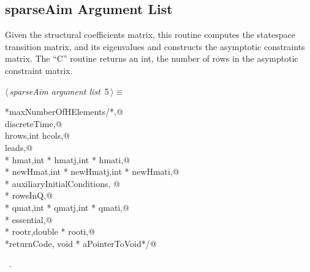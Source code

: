 \documentclass{article}
\begin{document}
\subsection{sparseAim Argument List}
\label{sec:sparseAim}
Given the structural coefficients matrix, this routine computes
the statespace transition matrix,
and its eigenvalues and constructs the asymptotic constraints matrix.
The ``C'' routine returns an int, the number of rows in the asymptotic constraint
matrix.
\begin{flushleft} \small
\begin{minipage}{\linewidth}\label{scrap1}\raggedright\small
{} $\langle\,${\itshape sparseAim argument list}\nobreak\ {\footnotesize {5}}$\,\rangle\equiv$
\vspace{-1ex}
\begin{list}{}{} \item
\mbox{}\verb@int *maxNumberOfHElements/*,@\\
\mbox{}\verb@int discreteTime,@\\
\mbox{}\verb@int hrows,int hcols,@\\
\mbox{}\verb@int leads,@\\
\mbox{}\verb@double * hmat,int * hmatj,int * hmati,@\\
\mbox{}\verb@double * newHmat,int * newHmatj,int * newHmati,@\\
\mbox{}\verb@int *  auxiliaryInitialConditions, @\\
\mbox{}\verb@int *  rowsInQ,@\\
\mbox{}\verb@double * qmat,int * qmatj,int * qmati,@\\
\mbox{}\verb@int * essential,@\\
\mbox{}\verb@double * rootr,double * rooti,@\\
\mbox{}\verb@int *returnCode, void * aPointerToVoid*/@\\
\mbox{}\verb@@{\NWsep}
\end{list}
\vspace{-1.5ex}
\footnotesize
\begin{list}{}{\setlength{\itemsep}{-\parsep}\setlength{\itemindent}{-\leftmargin}}
\item \NWtxtMacroRefIn\ .

\end{list}
\end{minipage}
\end{flushleft}
\end{document}
